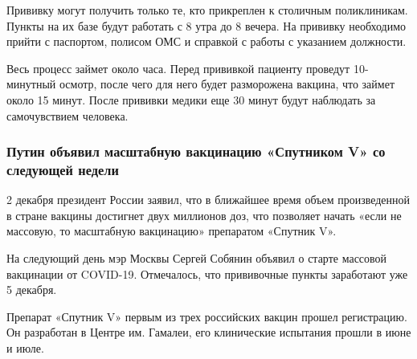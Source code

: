 Прививку могут получить только те, кто прикреплен к столичным поликлиникам.
Пункты на их базе будут работать с 8 утра до 8 вечера. На прививку необходимо
прийти с паспортом, полисом ОМС и справкой с работы с указанием должности.

Весь процесс займет около часа. Перед прививкой пациенту проведут 10-минутный
осмотр, после чего для него будет разморожена вакцина, что займет около 15
минут. После прививки медики еще 30 минут будут наблюдать за самочувствием
человека.

\subsubsection{Путин объявил масштабную вакцинацию «Спутником V» со следующей недели}

2 декабря президент России заявил, что в ближайшее время объем произведенной в
стране вакцины достигнет двух миллионов доз, что позволяет начать «если не
массовую, то масштабную вакцинацию» препаратом «Спутник V».

На следующий день мэр Москвы Сергей Собянин объявил о старте массовой
вакцинации от COVID-19. Отмечалось, что прививочные пункты заработают уже 5
декабря.

Препарат «Спутник V» первым из трех российских вакцин прошел регистрацию. Он
разработан в Центре им. Гамалеи, его клинические испытания прошли в июне и
июле.
